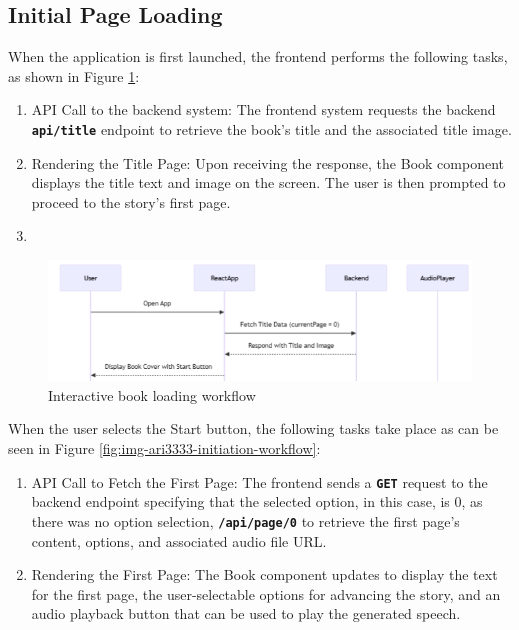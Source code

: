 \documentclass[conference]{IEEEtran}
\begin{document}
	
	\subsection{Initial Page Loading}
	
	When the application is first launched, the frontend performs the following tasks, as shown in Figure \ref{fig:img-ari3333-loading-workflow}:
	
	\begin{enumerate}[]
		\item API Call to the backend system: The frontend system requests the backend \textbf{\texttt{api/title}} endpoint to retrieve the book's title and the associated title image.
		\item Rendering the Title Page: Upon receiving the response, the Book component displays the title text and image on the screen. The user is then prompted to proceed to the story's first page.
	\item \end{enumerate}
	
	\begin{figure}[H]
		\centering
		\includegraphics[width=0.9\linewidth]{img/img-ARI3333-loading-workflow}
		\caption{Interactive book loading workflow}
		\label{fig:img-ari3333-loading-workflow}
	\end{figure}
	
	
	When the user selects the Start button, the following tasks take place as can be seen in Figure \ref{fig:img-ari3333-initiation-workflow}:
	
	\begin{enumerate}[]
		\item API Call to Fetch the First Page: The frontend sends a \textbf{\texttt{GET}} request to the backend endpoint specifying that the selected option, in this case, is 0, as there was no option selection, \textbf{\texttt{/api/page/0}} to retrieve the first page's content, options, and associated audio file URL.
		\item Rendering the First Page: The Book component updates to display the text for the first page, the user-selectable options for advancing the story, and an audio playback button that can be used to play the generated speech.
	\end{enumerate}
	
\end{document}
